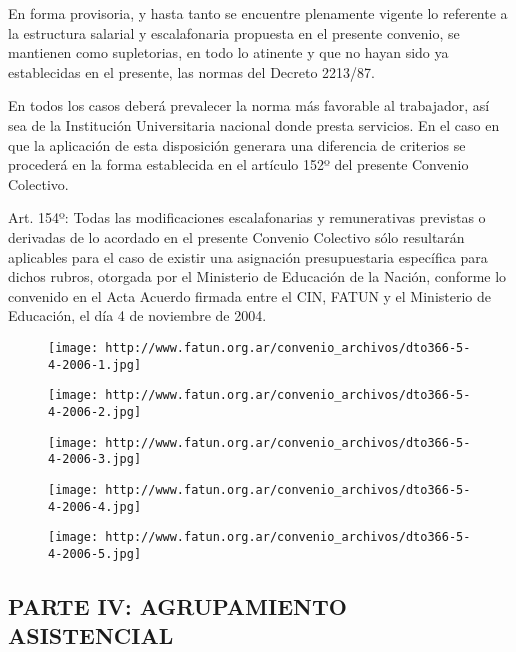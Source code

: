 \documentclass[]{article}
\begin{document}
En forma provisoria, y hasta tanto se encuentre plenamente vigente lo
referente a la estructura salarial y escalafonaria propuesta en el
presente convenio, se mantienen como supletorias, en todo lo atinente y
que no hayan sido ya establecidas en el presente, las normas del Decreto
2213/87.

En todos los casos deberá prevalecer la norma más favorable al
trabajador, así sea de la Institución Universitaria nacional donde
presta servicios. En el caso en que la aplicación de esta disposición
generara una diferencia de criterios se procederá en la forma
establecida en el artículo 152º del presente Convenio Colectivo.

Art. 154º: Todas las modificaciones escalafonarias y remunerativas
previstas o derivadas de lo acordado en el presente Convenio Colectivo
sólo resultarán aplicables para el caso de existir una asignación
presupuestaria específica para dichos rubros, otorgada por el Ministerio
de Educación de la Nación, conforme lo convenido en el Acta Acuerdo
firmada entre el CIN, FATUN y el Ministerio de Educación, el día 4 de
noviembre de 2004.

\begin{figure}[htbp]
\centering
\texttt{[image: http://www.fatun.org.ar/convenio\_archivos/dto366-5-4-2006-1.jpg]}
\caption{}
\end{figure}

\begin{figure}[htbp]
\centering
\texttt{[image: http://www.fatun.org.ar/convenio\_archivos/dto366-5-4-2006-2.jpg]}
\caption{}
\end{figure}

\begin{figure}[htbp]
\centering
\texttt{[image: http://www.fatun.org.ar/convenio\_archivos/dto366-5-4-2006-3.jpg]}
\caption{}
\end{figure}

\begin{figure}[htbp]
\centering
\texttt{[image: http://www.fatun.org.ar/convenio\_archivos/dto366-5-4-2006-4.jpg]}
\caption{}
\end{figure}

\begin{figure}[htbp]
\centering
\texttt{[image: http://www.fatun.org.ar/convenio\_archivos/dto366-5-4-2006-5.jpg]}
\caption{}
\end{figure}

\subsection{PARTE IV: AGRUPAMIENTO
ASISTENCIAL}\label{parte-iv-agrupamiento-asistencial}
\end{document}
